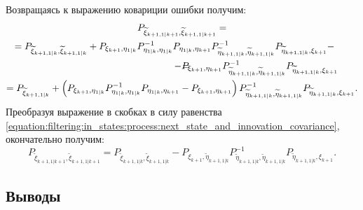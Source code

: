 Возвращаясь к выражению ковариции ошибки получим:
\begin{multline*}
	P_{\widetilde{\xi}_{k+1,1|k+1}, \widetilde{\xi}_{k+1,1|k+1}} = \\
	\shoveleft{= P_{\widetilde{\xi}_{k+1,1|k},\widetilde{\xi}_{k+1,1|k}} + P_{\xi_{k+1}, \eta_{1|k}} P_{\eta_{1|k},\eta_{1|k}}^{-1} P_{\eta_{1|k}, \eta_{k+1}} P_{\widetilde{\eta}_{k+1, 1|k}, \widetilde{\eta}_{k+1, 1|k}}^{-1} P_{\widetilde{\eta}_{k+1,1|k}, \xi_{k+1}} - }\\
	\shoveright{- P_{\xi_{k+1}, \eta_{k+1}} P_{\widetilde{\eta}_{k+1, 1|k}, \widetilde{\eta}_{k+1, 1|k}}^{-1} P_{\widetilde{\eta}_{k+1,1|k}, \xi_{k+1}}} = \\
	= P_{\widetilde{\xi}_{k+1,1|k}}
		+ \left ( P_{\xi_{k+1}, \eta_{1|k}} P_{\eta_{1|k},\eta_{1|k}}^{-1} P_{\eta_{1|k}, \eta_{k+1}} - P_{\xi_{k+1}, \eta_{k+1}} \right ) P_{\widetilde{\eta}_{k+1, 1|k}, \widetilde{\eta}_{k+1, 1|k}}^{-1} P_{\widetilde{\eta}_{k+1,1|k}, \xi_{k+1}}
	.
\end{multline*}
Преобразуя выражение в скобках в силу равенства \eqref{equation:filtering:in_states:process:next_state_and_innovation_covariance}, окончательно получим:
$$
	P_{\widetilde{\xi}_{k+1,1|k+1}, \widetilde{\xi}_{k+1,1|k+1}}
		= P_{\widetilde{\xi}_{k+1,1|k},\widetilde{\xi}_{k+1,1|k}}
		- P_{\xi_{k+1}, \widetilde{\eta}_{k+1,1|k}} P_{\widetilde{\eta}_{k+1, 1|k}, \widetilde{\eta}_{k+1, 1|k}}^{-1} P_{\widetilde{\eta}_{k+1,1|k}, \xi_{k+1}}
	.
$$

\subsection{Выводы}


